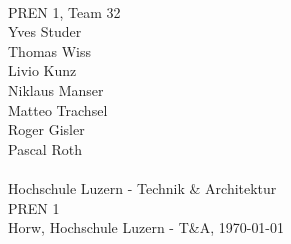 \begin{titlepage}
    \begin{center}
        \parindent0pt{\Huge\bfseries \myDokumentTyp}\\[0.5cm]
        {\huge PREN 1, Team 32}\\[1cm]
        Yves Studer\\
        Thomas Wiss\\
        Livio Kunz\\
        Niklaus Manser\\
        Matteo Trachsel\\
        Roger Gisler\\
        Pascal Roth\\
        \vspace*{1cm}
        {\Huge \myTitel}\\[0.5cm]
        
        \vfill{}
        {\normalsize Hochschule Luzern - Technik \& Architektur\\
         PREN 1}\\[0.6cm]
        {\normalsize Horw, Hochschule Luzern - T\&A, \today}
    \end{center}
\end{titlepage}
